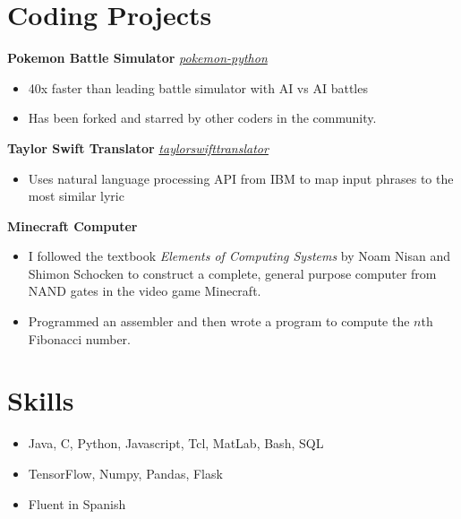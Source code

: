 \documentclass[10pt,letterpaper]{article}
\begin{document}
\section*{Coding Projects} \hrulefill 

\textbf{Pokemon Battle Simulator} \hfill {} \href{https://github.com/nicolaslindbloomairey/pokemon-python}{\textit{pokemon-python}}
\begin{itemize}
    \item 40x faster than leading battle simulator with AI vs AI battles
    \item Has been forked and starred by other coders in the community.
\end{itemize}

\textbf{Taylor Swift Translator} \hfill {} \href{https://github.com/nicolaslindbloomairey/taylorswifttranslator}{\textit{taylorswifttranslator}}
\begin{itemize}
    \item Uses natural language processing API from IBM to map input phrases to the most similar lyric
\end{itemize}

\textbf{Minecraft Computer}
\begin{itemize}
    \item I followed the textbook \textit{Elements of Computing Systems} by Noam Nisan and Shimon Schocken to construct a complete, general purpose computer from NAND gates in the video game Minecraft.
    \item Programmed an assembler and then wrote a program to compute the $n$th Fibonacci number.
\end{itemize}

%
\section*{Skills} \hrulefill 
\begin{itemize}
    \item Java, C, Python, Javascript, Tcl, MatLab, Bash, SQL
    \item TensorFlow, Numpy, Pandas, Flask
    \item Fluent in Spanish
\end{itemize}
\end{document}
